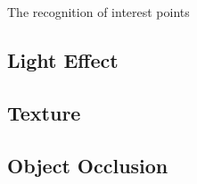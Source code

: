 The recognition of interest points 



\subsection{Light Effect}

\subsection{Texture}

\subsection{Object Occlusion}